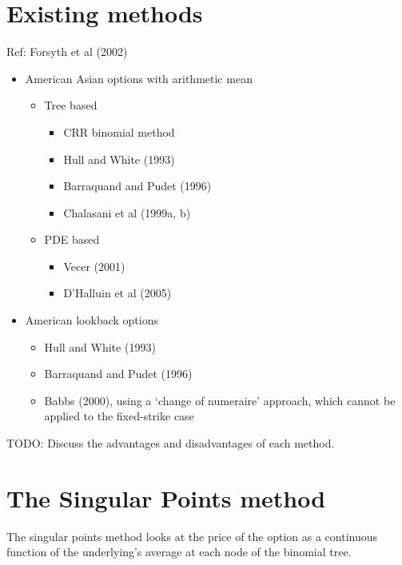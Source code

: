 \section{Existing methods}
\label{sec:existing-methods}
Ref: Forsyth et al (2002)
\begin{itemize}
\item American Asian options with arithmetic mean
	\begin{itemize}
	\item Tree based
		\begin{itemize}
		\item CRR binomial method
		\item Hull and White (1993)
		\item Barraquand and Pudet (1996)
		\item Chalasani et al (1999a, b)
		\end{itemize}
	\item PDE based
		\begin{itemize}
		\item Vecer (2001)
		\item D’Halluin et al (2005)
		\end{itemize}
	\end{itemize}
\item American lookback options
	\begin{itemize}
	\item Hull and White (1993)
	\item Barraquand and Pudet (1996)
	\item Babbs (2000), using a `change of numeraire' approach, which cannot be applied to the fixed-strike case
	\end{itemize}
\end{itemize}

TODO: Discuss the advantages and disadvantages of each method.

\section{The Singular Points method}
\label{sec:sing-points-meth}

The singular points method looks at the price of the option as a continuous function of the underlying's average at each node of the binomial tree.


